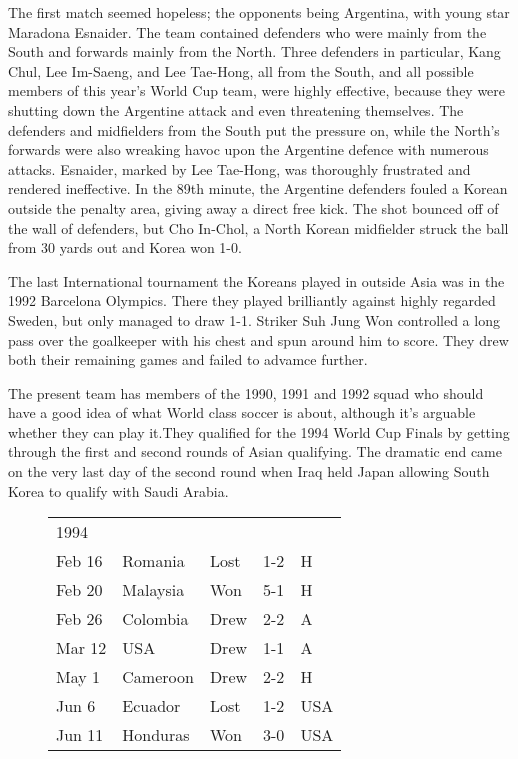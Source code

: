 The first match seemed hopeless; the opponents being Argentina, with young star
Maradona Esnaider. The team contained defenders who were mainly from the South
and forwards mainly from the North. Three defenders in particular, Kang Chul, 
Lee Im-Saeng, and Lee Tae-Hong, all from the South, and all possible members of
this year's World Cup team, were highly effective, because they were shutting 
down the Argentine attack and even threatening themselves. The defenders and 
midfielders from the South put the pressure on, while the North's forwards were
also wreaking havoc upon the Argentine defence with numerous attacks. Esnaider,
marked by Lee Tae-Hong, was thoroughly frustrated and rendered ineffective. In
the 89th minute, the Argentine defenders fouled a Korean outside the penalty 
area, giving away a direct free kick. The shot bounced off of the wall of 
defenders, but Cho In-Chol, a North Korean midfielder struck the ball from 30 
yards out and Korea won 1-0.

The last International tournament the Koreans played in outside Asia was in the
1992 Barcelona Olympics. There they played brilliantly against highly regarded
Sweden, but only managed to draw 1-1. Striker Suh Jung Won controlled a long
pass over the goalkeeper with his chest and spun around him to score. They drew
both their remaining games and failed to advamce further.

The present team has members of the 1990, 1991 and 1992 squad who should have 
a good idea of what World class soccer is about, although it's arguable whether
they can play it.They qualified for the 1994 World Cup Finals by getting 
through the first and second rounds of Asian qualifying. The dramatic end came
on the very last day of the second round when Iraq held Japan allowing South
Korea to qualify with Saudi Arabia.
\begin{figure}[H]
\begin{tabular}{l l l c l}
1994 & & & & \\
Feb 16 & Romania & Lost & 1-2 & H \\
Feb 20 & Malaysia & Won & 5-1 & H \\
Feb 26 & Colombia & Drew & 2-2 & A \\
Mar 12 & USA & Drew & 1-1 & A \\
May 1 & Cameroon & Drew & 2-2 & H \\
Jun 6 & Ecuador & Lost & 1-2 & USA \\
Jun 11 & Honduras & Won & 3-0 & USA \\
\end{tabular}
\end{figure}

